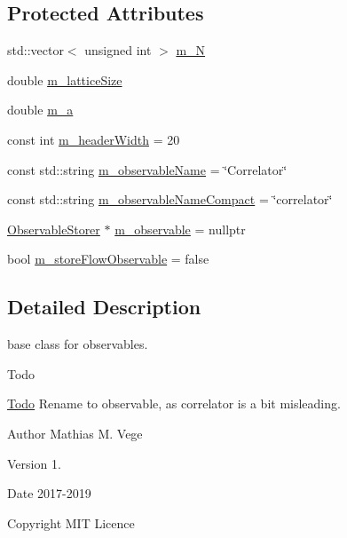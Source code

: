 \subsection*{Protected Attributes}
\begin{DoxyCompactItemize}
\item 
std\+::vector$<$ unsigned int $>$ \mbox{\hyperlink{class_correlator_a524ca5c4fb6eb1e5eb0e7e766cab883c}{m\+\_\+N}}
\item 
double \mbox{\hyperlink{class_correlator_a8aca926ff9e4fe5fbc561d40a9fd513b}{m\+\_\+lattice\+Size}}
\item 
double \mbox{\hyperlink{class_correlator_ab1ba5ec775336ad0ed5fec85a21bdc9b}{m\+\_\+a}}
\item 
const int \mbox{\hyperlink{class_correlator_aba970dc6dafca82a4ebcb11812c86029}{m\+\_\+header\+Width}} = 20
\item 
const std\+::string \mbox{\hyperlink{class_correlator_abfd6599333d4ca222964ea36c7339f5c}{m\+\_\+observable\+Name}} = \char`\"{}Correlator\char`\"{}
\item 
const std\+::string \mbox{\hyperlink{class_correlator_ad5cbec48d095ae66da43c25b6a99474f}{m\+\_\+observable\+Name\+Compact}} = \char`\"{}correlator\char`\"{}
\item 
\mbox{\hyperlink{class_observable_storer}{Observable\+Storer}} $\ast$ \mbox{\hyperlink{class_correlator_a031c43c74c22d6b6308182228c32c5e7}{m\+\_\+observable}} = nullptr
\item 
bool \mbox{\hyperlink{class_correlator_aac0590e0ae6e3edc790279931b06a03c}{m\+\_\+store\+Flow\+Observable}} = false
\end{DoxyCompactItemize}


\subsection{Detailed Description}
base class for observables. 

\begin{DoxyRefDesc}{Todo}
\item[\mbox{\hyperlink{todo__todo000004}{Todo}}]Rename to observable, as correlator is a bit misleading.\end{DoxyRefDesc}


\begin{DoxyAuthor}{Author}
Mathias M. Vege 
\end{DoxyAuthor}
\begin{DoxyVersion}{Version}
1. 
\end{DoxyVersion}
\begin{DoxyDate}{Date}
2017-\/2019 
\end{DoxyDate}
\begin{DoxyCopyright}{Copyright}
M\+IT Licence 
\end{DoxyCopyright}


